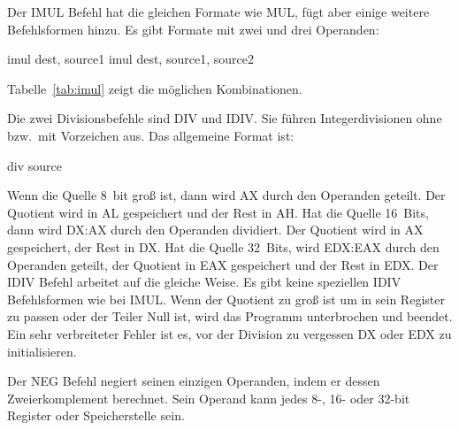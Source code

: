 Der {\code IMUL} Befehl hat die gleichen Formate wie {\code MUL},
f\"{u}gt aber einige weitere Befehlsformen hinzu. Es gibt Formate mit
zwei und drei Operanden:
\begin{AsmCodeListing}[numbers=none, frame=none]
      imul   dest, source1
      imul   dest, source1, source2
\end{AsmCodeListing}
\noindent Tabelle~\ref{tab:imul} zeigt die m\"{o}glichen Kombinationen.
 

  Die zwei
Divisionsbefehle sind {\code DIV} und {\code IDIV}\@. Sie f\"{u}hren
Integerdivisionen ohne bzw.\ mit Vorzeichen aus. Das allgemeine
Format ist:  \enlargethispage*{3\baselineskip} %
\begin{AsmCodeListing}[numbers=none, frame=none]
      div   source
\end{AsmCodeListing}
Wenn die Quelle 8~bit gro{\ss} ist, dann wird AX durch den Operanden
geteilt. Der Quotient wird in AL gespeichert und der Rest in AH\@.
Hat die Quelle 16~Bits, dann wird DX:AX durch den Operanden
dividiert. Der Quotient wird in AX gespeichert, der Rest in DX\@.
Hat die Quelle 32~Bits, wird EDX:EAX  durch
den Operanden geteilt, der Quotient in EAX gespeichert und der Rest
in EDX\@. Der {\code IDIV}  Befehl
arbeitet auf die gleiche Weise. Es gibt keine speziellen {\code
IDIV} Befehlsformen wie bei {\code IMUL}\@. Wenn der Quotient zu
gro{\ss} ist um in sein Register zu passen oder der Teiler Null ist,
wird das Programm unterbrochen und beendet. Ein sehr verbreiteter
Fehler ist es, vor der Division zu vergessen DX oder EDX zu
initialisieren. 

Der {\code NEG}  Befehl negiert seinen
einzigen Operanden, indem er dessen Zweierkomplement berechnet. Sein
Operand kann jedes 8-, 16- oder 32-bit Register oder Speicherstelle
sein.

